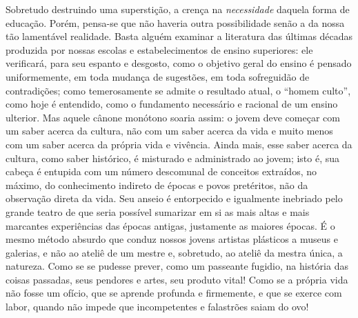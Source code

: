     Sobretudo destruindo uma superstição, a crença na \emph{necessidade}
    daquela forma de educação. Porém, pensa-se que não haveria outra
    possibilidade senão a da nossa tão lamentável realidade. Basta
    alguém examinar a literatura das últimas décadas produzida por
    nossas escolas e estabelecimentos de ensino superiores: ele
    verificará, para seu espanto e desgosto, como o objetivo geral do
    ensino é pensado uniformemente, em toda mudança de sugestões, em
    toda sofreguidão de contradições; como temerosamente se admite o
    resultado atual, o ``homem culto'', como hoje é entendido, como o
    fundamento necessário e racional de um ensino ulterior. Mas aquele
    cânone monótono soaria assim: o jovem deve começar com um saber
    acerca da cultura, não com um saber acerca da vida e muito menos com
    um saber acerca da própria vida e vivência. Ainda mais, esse saber
    acerca da cultura, como saber histórico, é misturado e administrado
    ao jovem; isto é, sua cabeça é entupida com um número descomunal de
    conceitos extraídos, no máximo, do conhecimento indireto de épocas e
    povos pretéritos, não da observação direta da vida. Seu anseio é
    entorpecido e igualmente inebriado pelo grande teatro de que seria
    possível sumarizar em si as mais altas e mais marcantes experiências
    das épocas antigas, justamente as maiores épocas. É o mesmo método
    absurdo que conduz nossos jovens artistas plásticos a museus e
    galerias, e não ao ateliê de um mestre e, sobretudo, ao ateliê da
    mestra única, a natureza. Como se se pudesse prever, como um
    passeante fugidio, na história das coisas passadas, seus pendores e
    artes, seu produto vital! Como se a própria vida não fosse um
    ofício, que se aprende profunda e firmemente, e que se exerce com
    labor, quando não impede que incompetentes e falastrões saiam do
    ovo!

